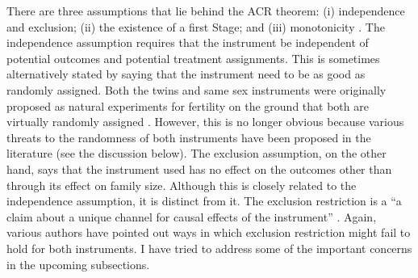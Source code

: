 There are three assumptions that lie behind the ACR theorem: (i) independence and exclusion; (ii) the existence of a first Stage; and (iii) monotonicity \parencite{Angrist2009}. The independence assumption requires that the instrument be independent of potential outcomes and potential treatment assignments. This is sometimes alternatively stated by saying that the instrument need to be as good as randomly assigned. Both the twins and same sex instruments were originally proposed as natural experiments for fertility on the ground that both are virtually randomly assigned \parencite{rosenzweig_testing_1980,angrist_children_1998}. However, this is no longer obvious because various threats to the randomness of both instruments have been proposed in the literature (see the discussion below). The exclusion assumption, on the other hand, says that the instrument used has no effect on the outcomes other than through its effect on family size.  Although this is closely related to the independence assumption, it is distinct from it. The exclusion restriction is a \enquote{a claim about a unique channel for causal effects of the instrument} \parencite[p.~153]{Angrist2009}. Again, various authors have pointed out ways in which exclusion restriction might fail to hold for both instruments. I have tried to address some of the important concerns in the upcoming subsections. 

